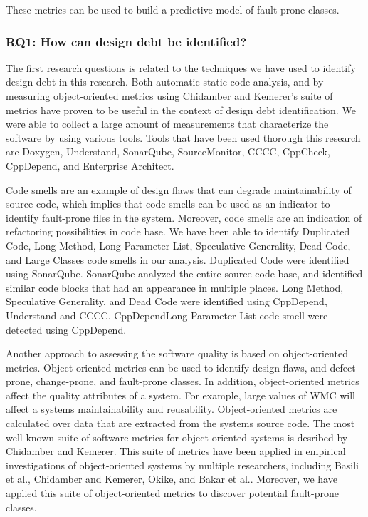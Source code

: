 These metrics can be used to build a predictive model of fault-prone classes.




\subsubsection{RQ1: How can design debt be identified?} 
The first research questions is related to the techniques we have used to identify design debt in this research. Both automatic static code analysis, and by measuring object-oriented metrics using Chidamber and Kemerer's suite of metrics have proven to be useful in the context of design debt identification. We were able to collect a large amount of measurements that characterize the software by using various tools. Tools that have been used thorough this research are Doxygen, Understand, SonarQube, SourceMonitor, CCCC, CppCheck, CppDepend, and Enterprise Architect.

Code smells are an example of design flaws that can degrade maintainability of source code, which implies that code smells can be used as an indicator to identify fault-prone files in the system. Moreover, code smells are an indication of refactoring possibilities in code base. We have been able to identify Duplicated Code, Long Method, Long Parameter List, Speculative Generality, Dead Code, and Large Classes code smells in our analysis. Duplicated Code were identified using SonarQube. SonarQube analyzed the entire source code base, and identified similar code blocks that had an appearance in multiple places. Long Method, Speculative Generality, and Dead Code were identified using CppDepend, Understand and CCCC. CppDependLong Parameter List code smell were detected using CppDepend.

Another approach to assessing the software quality is based on object-oriented metrics\cite{codabux2016technical}. Object-oriented metrics can be used to identify design flaws, and defect-prone, change-prone, and fault-prone classes. In addition, object-oriented metrics affect the quality attributes of a system. For example, large values of WMC will affect a systems maintainability and reusability\cite{quenelobject}. Object-oriented metrics are calculated over data that are extracted from the systems source code. The most well-known suite of software metrics for object-oriented systems is desribed by Chidamber and Kemerer. This suite of metrics have been applied in empirical investigations of object-oriented systems by multiple researchers, including Basili et al.\cite{basili1996validation}, Chidamber and Kemerer\cite{chidamber1994metrics}, Okike\cite{okike2010pedagogical}, and Bakar et al.\cite{bakar2014analysis}. Moreover, we have applied this suite of object-oriented metrics to discover potential fault-prone classes.

